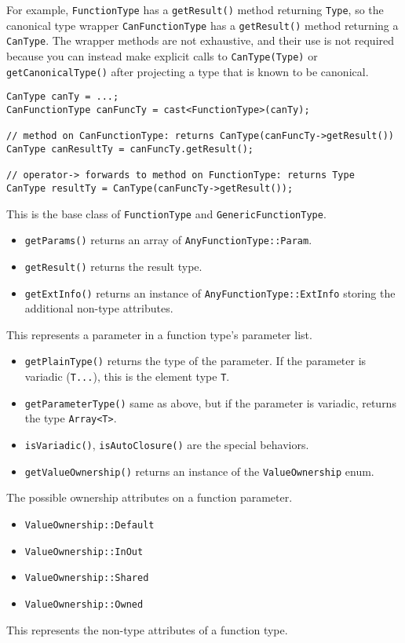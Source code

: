 \documentclass[../generics]{subfiles}
\begin{document}
For example, \texttt{FunctionType} has a \texttt{getResult()} method returning \texttt{Type}, so the canonical type wrapper \texttt{CanFunctionType} has a \texttt{getResult()} method returning a \texttt{CanType}. The wrapper methods are not exhaustive, and their use is not required because you can instead make explicit calls to \texttt{CanType(Type)} or \texttt{getCanonicalType()} after projecting a type that is known to be canonical.
\begin{Verbatim}
CanType canTy = ...;
CanFunctionType canFuncTy = cast<FunctionType>(canTy);

// method on CanFunctionType: returns CanType(canFuncTy->getResult())
CanType canResultTy = canFuncTy.getResult();

// operator-> forwards to method on FunctionType: returns Type
CanType resultTy = CanType(canFuncTy->getResult());
\end{Verbatim}

This is the base class of \texttt{FunctionType} and \texttt{GenericFunctionType}.
\begin{itemize}
\item \texttt{getParams()} returns an array of \texttt{AnyFunctionType::Param}.
\item \texttt{getResult()} returns the result type.
\item \texttt{getExtInfo()} returns an instance of \texttt{AnyFunctionType::ExtInfo} storing the additional non-type attributes.
\end{itemize}

This represents a parameter in a function type's parameter list.
\begin{itemize}
\item \texttt{getPlainType()} returns the type of the parameter. If the parameter is variadic (\texttt{T...}), this is the element type \texttt{T}.
\item \texttt{getParameterType()} same as above, but if the parameter is variadic, returns the type \texttt{Array<T>}.
\item \texttt{isVariadic()}, \texttt{isAutoClosure()} are the special behaviors.
\item \texttt{getValueOwnership()} returns an instance of the \texttt{ValueOwnership} enum.
\end{itemize}

The possible ownership attributes on a function parameter.
\begin{itemize}
\item \texttt{ValueOwnership::Default}
\item \texttt{ValueOwnership::InOut}
\item \texttt{ValueOwnership::Shared}
\item \texttt{ValueOwnership::Owned}
\end{itemize}

This represents the non-type attributes of a function type.
\end{document}
